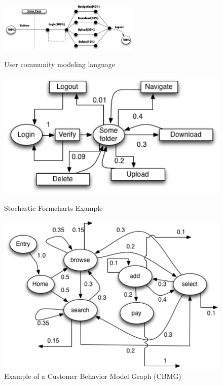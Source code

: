 \documentclass[espaco=umemeio,chapter=TITLE,twoside,openright]{abnt}
\begin{document}
\begin{figure}[!ht]
\begin{minipage}{1\textwidth}
\centering
\includegraphics[width=0.6\textwidth]{./images/ucml.png}
\caption{User community modeling language \cite{Wang2013}}
\label{fig:ucml}
\end{minipage}
\begin{minipage}{1\textwidth}
\begin{minipage}{.5\textwidth}
\centering
\includegraphics[width=1\textwidth]{./images/stochastic.png}
\caption{Stochastic Formcharts Example \cite{Draheim2006b} \cite{Wang2013}}
\label{fig:stform}
\end{minipage}
\begin{minipage}{.5\textwidth}
\centering
\includegraphics[width=1\textwidth]{./images/cbmg.png}
\caption{Example of a Customer Behavior Model Graph (CBMG)  \cite{Menasce2002a} \cite{Jiang2010} \cite{MohammadS.Obaidat}}
\label{fig:cbmg}
\end{minipage}
\end{minipage}
\end{figure}
\end{document}
